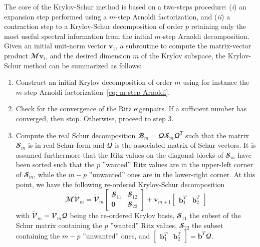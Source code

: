     The core of the Krylov-Schur method is based on a two-steps procedure: (\emph{i}) an expansion step performed using a $m$-step Arnoldi factorization, and (\emph{ii}) a contraction step to a Krylov-Schur decomposition of order $p$ retaining only the most useful spectral information from the initial $m$-step Arnoldi decomposition. Given an initial unit-norm vector $\mathbf{v}_1$, a subroutine to compute the matrix-vector product $\mathbfcal{M} \mathbf{v}_i$, and the desired dimension $m$ of the Krylov subspace, the Krylov-Schur method can be summarized as follows:
    \begin{enumerate}
      \item Construct an initial Krylov decomposition of order $m$ using for instance the $m$-step Arnoldi factorization~\eqref{eq: m-step Arnoldi}.

      \item Check for the convergence of the Ritz eigenpairs. If a sufficient number has converged, then stop. Otherwise, proceed to step 3.

      \item Compute the real Schur decomposition $\mathbfcal{B}_m = \mathbfcal{Q} \mathbfcal{S}_m \mathbfcal{Q}^T$ such that the matrix $\mathbfcal{S}_m$ is in real Schur form and $\mathbfcal{Q}$ is the associated matrix of Schur vectors. It is assumed furthermore that the Ritz values on the diagonal blocks of $\mathbfcal{S}_m$ have been sorted such that the $p$ ''wanted'' Ritz values are in the upper-left corner of $\mathbfcal{S}_m$, while the $m-p$ ''unwanted'' ones are in the lower-right corner. At this point, we have the following re-ordered Krylov-Schur decomposition
      \begin{equation}
        \mathbfcal{M} \tilde{\mathbfcal{V}}_m =
        \tilde{\mathbfcal{V}}_m
        \begin{bmatrix}
         \mathbfcal{S}_{11} & \mathbfcal{S}_{12} \\
         {\mathbf 0}     & \mathbfcal{S}_{22}
       \end{bmatrix}
       + {\mathbf v}_{m+1}\begin{bmatrix}
                           {\mathbf b}_{1}^T & {\mathbf b}_{2}^T
                           \end{bmatrix}
        \label{eq: Krylov-Schur decomposition}
      \end{equation}
      with $\tilde{\mathbfcal{V}}_m = \mathbfcal{V}_m  \mathbfcal{Q}$ being the re-ordered Krylov basis, $\mathbfcal{S}_{11}$ the subset of the Schur matrix containing the $p$ ''wanted'' Ritz values, $\mathbfcal{S}_{22}$ the subset containing the $m-p$ ''unwanted'' ones, and $\begin{bmatrix} {\mathbf b}_1^T & {\mathbf b}_2^T \end{bmatrix} = {\mathbf b}^T \mathbfcal{Q}$.


\end{enumerate}
